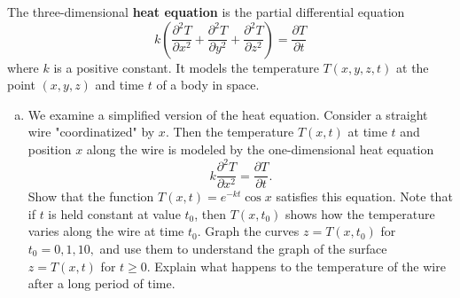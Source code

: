 \documentclass[11pt,letterpaper]{hmcpset}
\begin{document}
	\begin{solution}
		\vfill
	\end{solution}
	
	\newpage
	
	\begin{problem}[2.4.29a] The three-dimensional \textbf{heat equation} is the partial differential equation
	$$ k \left( \frac{\partial^2T}{\partial x^2} + \frac{\partial^2T}{\partial y^2} + \frac{\partial^2 T}{\partial z^2} \right) = \frac{\partial T}{\partial t} $$
	where $k$ is a positive constant. It models the temperature $T(x,y,z,t)$ at the point $(x,y,z)$ and time $t$ of a body in space.
	\begin{enumerate}[(a)]
		\item We examine a simplified version of the heat equation. Consider a straight wire "coordinatized" by $x$. Then the temperature $T(x,t)$ at time $t$ and position $x$ along the wire is modeled by the one-dimensional heat equation
		$$ k  \frac{\partial^2T}{\partial x^2} = \frac{\partial T}{\partial t}. $$
		Show that the function $T(x,t) = e^{-kt}\cos{x}$ satisfies this equation. Note that if $t$ is held constant at value $t_0$, then $T(x,t_0)$ shows how the temperature varies along the wire at time $t_0$. Graph the curves $z = T(x, t_0)$ for $t_0 = 0,1,10,$ and use them to understand the graph of the surface $z=T(x,t)$ for $t \geq 0$. Explain what happens to the temperature of the wire after a long period of time.
	\end{enumerate}
	\end{problem}
	
	\begin{solution}
		\vfill
	\end{solution}
	
\end{document}
